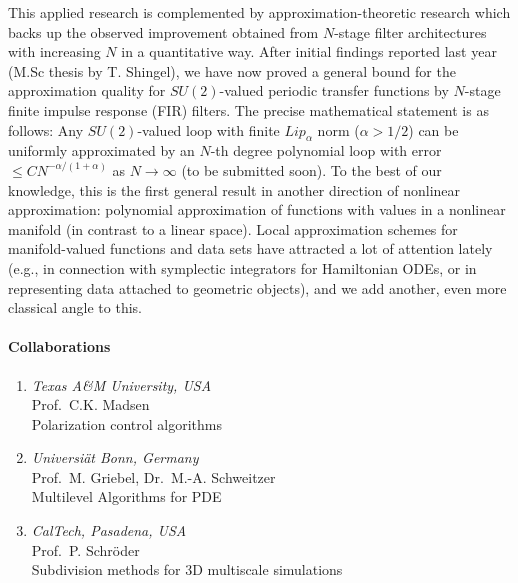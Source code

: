 This applied research is complemented by approximation-theoretic research
which backs up the observed improvement obtained from $N$-stage
filter architectures with increasing $N$ in a quantitative way.
After initial findings reported last year (M.Sc thesis by T. Shingel),
we have now proved a general bound for the approximation quality for
$SU(2)$-valued periodic transfer functions by $N$-stage finite impulse 
response (FIR) filters. The precise mathematical statement is as follows:
Any $SU(2)$-valued loop with finite $Lip_\alpha$ norm ($\alpha>1/2$) can be uniformly
approximated by an $N$-th degree polynomial loop with error $\le CN^{-\alpha/(1+\alpha)}$
as $N\to \infty$ (to be submitted soon). To the best of our knowledge, 
this is the first general result in another direction of
nonlinear approximation: polynomial approximation of functions with values in a
nonlinear manifold (in contrast to a linear space). Local approximation 
schemes for manifold-valued functions and data sets have attracted a lot of 
attention lately (e.g., in connection with symplectic integrators for Hamiltonian
ODEs, or in representing data attached to geometric objects), 
and we add another, even more classical angle to this.

\paragraph{Collaborations}
\begin{enumerate}
\item {\sl Texas A\&M University, USA} \\
Prof.~C.K. Madsen \\
Polarization control algorithms
\item {\sl Universi\"at Bonn, Germany} \\
Prof.~M. Griebel,  Dr.~M.-A. Schweitzer \\
Multilevel Algorithms for PDE
\item  {\sl CalTech, Pasadena, USA } \\
Prof.~P. Schr\"oder \\
Subdivision methods for 3D multiscale simulations
\end{enumerate}

